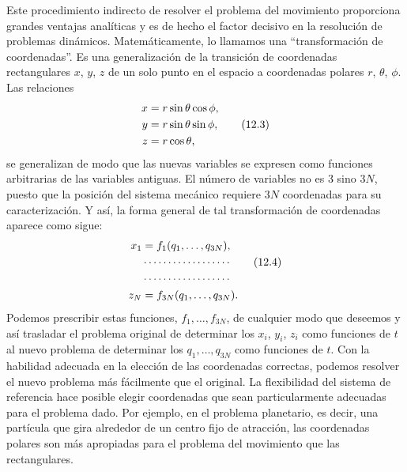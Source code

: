 \documentclass[12pt,a4paper]{book}
\begin{document}
Este procedimiento indirecto de resolver el problema del movimiento proporciona grandes ventajas anal\'iticas y es de hecho el factor decisivo en la resoluci\'on de problemas din\'amicos. Matem\'aticamente, lo llamamos una ``transformaci\'on de coordenadas''. Es una generalizaci\'on de la transici\'on de coordenadas rectangulares $x$, $y$, $z$ de un solo punto en el espacio a coordenadas polares $r$, $\theta$, $\phi$. Las relaciones
\begin{align}
x &= r \sin\theta \cos\phi, \notag\\
y &= r \sin\theta \sin\phi, \tag{12.3}\\
z &= r \cos\theta, \notag
\end{align}
se generalizan de modo que las nuevas variables se expresen como funciones arbitrarias de las variables antiguas. El n\'umero de variables no es 3 sino $3N$, puesto que la posici\'on del sistema mec\'anico requiere $3N$ coordenadas para su caracterizaci\'on. Y as\'i, la forma general de tal transformaci\'on de coordenadas aparece como sigue:
\begin{align}
x_1 &= f_1(q_1, \ldots, q_{3N}), \notag\\
&\cdots\cdots\cdots\cdots\cdots\cdots \tag{12.4}\\
&\cdots\cdots\cdots\cdots\cdots\cdots \notag\\
z_N &= f_{3N}(q_1, \ldots, q_{3N}). \notag
\end{align}
Podemos prescribir estas funciones, $f_1, \ldots, f_{3N}$, de cualquier modo que deseemos y as\'i trasladar el problema original de determinar los $x_i$, $y_i$, $z_i$ como funciones de $t$ al nuevo problema de determinar los $q_1, \ldots, q_{3N}$ como funciones de $t$. Con la habilidad adecuada en la elecci\'on de las coordenadas correctas, podemos resolver el nuevo problema m\'as f\'acilmente que el original. La flexibilidad del sistema de referencia hace posible elegir coordenadas que sean particularmente adecuadas para el problema dado. Por ejemplo, en el problema planetario, es decir, una part\'icula que gira alrededor de un centro fijo de atracci\'on, las coordenadas polares son m\'as apropiadas para el problema del movimiento que las rectangulares.
\end{document}
